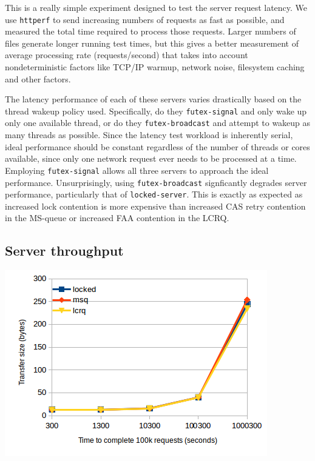 \documentclass[twoside,10pt]{article}
\newenvironment{Figure}
  {\par\medskip\noindent\minipage{\linewidth}}
  {\endminipage\par\medskip}
\begin{document}
\begin{multicols}{2}
\begin{Figure}
\end{Figure}

This is a really simple experiment designed to test the server request
latency. We use \verb+httperf+ to send increasing numbers of requests
as fast as possible, and measured the total time required to process
those requests. Larger numbers of files generate longer running test
times, but this gives a better measurement of average processing rate
(requests/second) that takes into account nondeterministic factors
like TCP/IP warmup, network noise, filesystem caching and other factors.

The latency performance of each of these servers varies drastically
based on the thread wakeup policy used. Specifically, do they
\verb+futex-signal+ and only wake up only one available thread, or do
they \verb+futex-broadcast+ and attempt to wakeup as many threads as
possible. Since the latency test workload is inherently serial, ideal
performance should be constant regardless of the number of threads or
cores available, since only one network request ever needs to be
processed at a time. Employing \verb+futex-signal+ allows all three
servers to approach the ideal performance. Unsurprisingly, using
\verb+futex-broadcast+ signficantly degrades server performance,
particularly that of \verb+locked-server+. This is exactly as expected
as increased lock contention is more expensive than increased CAS
retry contention in the MS-queue or increased FAA contention in the
LCRQ.

\subsection{Server throughput}

\begin{Figure}
\includegraphics[width=\linewidth]{img/latencyfilesize.png}
\end{Figure}


\end{multicols}
\end{document}
